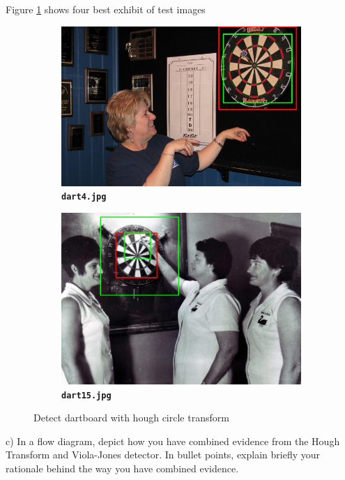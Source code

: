 \documentclass[12pt]{article}
\begin{document}
Figure \ref{fig:4} shows four best exhibit of test images 
\begin{figure}[htb]
	\centering
	\begin{subfigure}[b]{.48\linewidth}
		\centering
		\includegraphics[width=\linewidth]{task3/result/dart0_detected.jpg}
		\caption{\textbf{\texttt{dart4.jpg}}}
	\end{subfigure}
	\begin{subfigure}[b]{.48\linewidth}
		\centering
		\includegraphics[width=\linewidth]{task3/result/dart15_detected.jpg}
		\caption{\textbf{\texttt{dart15.jpg}}}
	\end{subfigure}
	\caption{Detect dartboard with hough circle transform}
	\label{fig:4}
\end{figure}


c) In a flow diagram, depict how you have combined evidence from the Hough Transform and Viola-Jones detector. In bullet points, explain briefly your rationale behind the way you have combined evidence.\\
\end{document}
